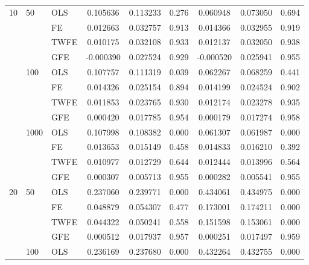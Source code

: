 \begin{tabular}{lll|ccc|ccc}
10 & 50   & OLS  &  0.105636 &  0.113233 &                 0.276 &  0.060948 &  0.073050 &                 0.694 \\
   &      & FE  &  0.012663 &  0.032757 &                 0.913 &  0.014366 &  0.032955 &                 0.919 \\
   &      & TWFE  &  0.010175 &  0.032108 &                 0.933 &  0.012137 &  0.032050 &                 0.938 \\
   &      & GFE  & -0.000390 &  0.027524 &                 0.929 & -0.000520 &  0.025941 &                 0.955 \\
   & 100  & OLS  &  0.107757 &  0.111319 &                 0.039 &  0.062267 &  0.068259 &                 0.441 \\
   &      & FE  &  0.014326 &  0.025154 &                 0.894 &  0.014199 &  0.024524 &                 0.902 \\
   &      & TWFE  &  0.011853 &  0.023765 &                 0.930 &  0.012174 &  0.023278 &                 0.935 \\
   &      & GFE  &  0.000420 &  0.017785 &                 0.954 &  0.000179 &  0.017274 &                 0.958 \\
   & 1000 & OLS  &  0.107998 &  0.108382 &                 0.000 &  0.061307 &  0.061987 &                 0.000 \\
   &      & FE  &  0.013653 &  0.015149 &                 0.458 &  0.014833 &  0.016210 &                 0.392 \\
   &      & TWFE  &  0.010977 &  0.012729 &                 0.644 &  0.012444 &  0.013996 &                 0.564 \\
   &      & GFE  &  0.000307 &  0.005713 &                 0.955 &  0.000282 &  0.005541 &                 0.955 \\
20 & 50   & OLS  &  0.237060 &  0.239771 &                 0.000 &  0.434061 &  0.434975 &                 0.000 \\
   &       & FE  &  0.048879 &  0.054307 &                 0.477 &  0.173001 &  0.174211 &                 0.000 \\
   &      & TWFE  &  0.044322 &  0.050241 &                 0.558 &  0.151598 &  0.153061 &                 0.000 \\
   &      & GFE  &  0.000512 &  0.017937 &                 0.957 &  0.000251 &  0.017497 &                 0.959 \\
   & 100  & OLS  &  0.236169 &  0.237680 &                 0.000 &  0.432264 &  0.432755 &                 0.000 \\

\end{tabular}
